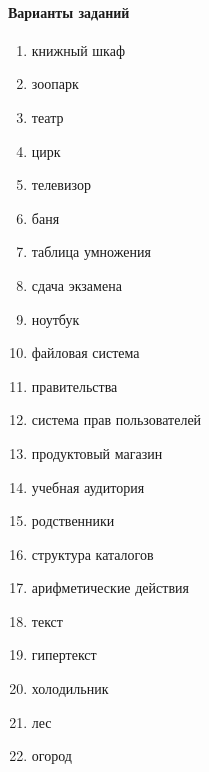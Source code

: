 \documentclass[a4paper,12pt]{article}
\begin{document}
\paragraph{Варианты заданий}
\begin{enumerate}
	\item книжный шкаф
	\item зоопарк
	\item театр
	\item цирк
	\item телевизор
	\item баня
	\item таблица умножения
	\item сдача экзамена
	\item ноутбук
	\item файловая система
	\item правительства
	\item система прав пользователей
	\item продуктовый магазин
	\item учебная аудитория
	\item родственники
	\item структура каталогов
	\item арифметические действия
	\item текст
	\item гипертекст
	\item холодильник
	\item лес
	\item огород
\end{enumerate}
\end{document}
